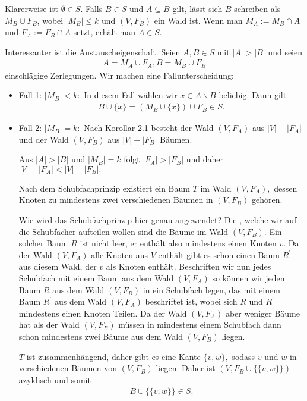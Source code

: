 \begin{solution}

  Klarerweise ist $\emptyset \in S.$ Falls $B \in S$ und $A \subseteq B$ gilt, lässt sich $B$ schreiben als $M_B \cup F_B$, wobei $|M_B| \leq k$ und $(V, F_B)$ ein Wald ist. Wenn man $M_A := M_B \cap A$ und $F_A := F_B \cap A$ setzt, erhält man $A \in S$.

  Interessanter ist die Austauscheigenschaft. Seien $A, B \in S$ mit $|A| > |B|$ und seien
  \begin{align*}
      A = M_A \cup F_A, B = M_B \cup F_B
  \end{align*}
  einschlägige Zerlegungen.
  Wir machen eine Fallunterscheidung:
  \begin{itemize}
      \item Fall 1: $|M_B| < k:$ In diesem Fall wählen wir $x \in A\backslash B$ beliebig. Dann gilt
      \begin{align*}
      B \cup \{x\} = (M_B \cup \{x\}) \cup F_B \in S.
      \end{align*}
      \item Fall 2: $|M_B| = k:$ Nach Korollar 2.1 besteht der Wald $(V, F_A)$ aus $|V| - |F_A|$ und der Wald $(V, F_B)$ aus $|V| - |F_B|$ Bäumen.

      Aus $|A| > |B|$ und $|M_B| = k$ folgt $|F_A| > |F_B|$ und daher $|V| - |F_A| < |V| - |F_B|.$

      Nach dem Schubfachprinzip existiert ein Baum $T$ im Wald $(V, F_A),$ dessen Knoten zu mindestens zwei verschiedenen Bäumen in $(V, F_B)$ gehören.

      Wie wird das Schubfachprinzip hier genau angewendet? Die , welche wir auf die Schubfächer aufteilen wollen sind die Bäume im Wald $(V,F_B)$. Ein solcher Baum $R$ ist nicht leer, er enthält also mindestens einen Knoten $v$. Da der Wald $(V,F_A)$ alle Knoten aus $V$ enthält gibt es schon einen Baum $R^\prime$ aus diesem Wald, der $v$ als Knoten enthält. Beschriften wir nun jedes Schubfach mit einem Baum aus dem Wald $(V,F_A)$ so können wir jeden Baum $R$ aus dem Wald $(V,F_B)$ in ein Schubfach legen, das mit einem Baum $R^\prime$ aus dem Wald $(V,F_A)$ beschriftet ist, wobei sich $R$ und $R^\prime$ mindestens einen Knoten Teilen. Da der Wald $(V,F_A)$ aber weniger Bäume hat als der Wald $(V,F_B)$ müssen in mindestens einem Schubfach dann schon mindestens zwei Bäume aus dem Wald $(V,F_B)$ liegen.

      $T$ ist zusammenhängend, daher gibt es eine Kante $\{v, w\},$ sodass $v$ und $w$ in verschiedenen Bäumen von $(V, F_B)$ liegen. Daher ist $(V, F_B \cup \{\{v, w\}\})$ azyklisch und somit
      \begin{align*}
          B \cup \{\{v, w\}\} \in S.
      \end{align*}
  \end{itemize}
\end{solution}

